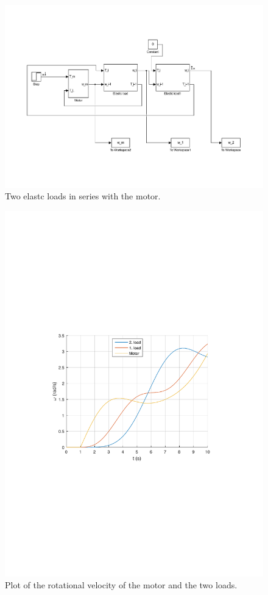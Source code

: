 \documentclass{article}
\begin{document}
\begin{figure}[!ht]
    \centering
    \includegraphics[width = \textwidth]{ex1_2}
    \caption{Two elastc loads in series with the motor.}
    \label{fig:twoloads} 
\end{figure}

\begin{figure}[!ht]
    \centering
    \includegraphics[width = \textwidth]{ex1_2b}
    \caption{Plot of the rotational velocity of the motor and the two loads.}
    \label{fig:veloplot} 
\end{figure}
\end{document}
